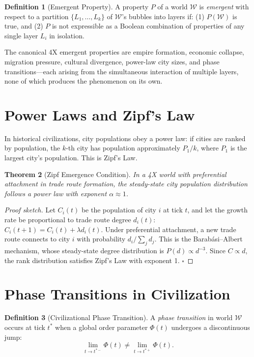 \documentclass[11pt,a4paper,openany]{book}
\theoremstyle{plain}
\newtheorem{theorem}{Theorem}[chapter]
\theoremstyle{definition}
\newtheorem{definition}[theorem]{Definition}
\theoremstyle{remark}
\newcommand{\world}{\ensuremath{\mathcal{W}}}
\begin{document}
\begin{definition}[Emergent Property]
  A property $P$ of a world $\world$ is \emph{emergent} with respect to
  a partition $\{L_1, \ldots, L_k\}$ of $\world$'s bubbles into layers if:
  (1) $P(\world)$ is true, and
  (2) $P$ is not expressible as a Boolean combination of properties
  of any single layer $L_i$ in isolation.
\end{definition}

The canonical 4X emergent properties are empire formation, economic
collapse, migration pressure, cultural divergence, power-law city sizes,
and phase transitions---each arising from the simultaneous interaction
of multiple layers, none of which produces the phenomenon on its own.

\section{Power Laws and Zipf's Law}

In historical civilizations, city populations obey a power law: if cities
are ranked by population, the $k$-th city has population approximately
$P_1 / k$, where $P_1$ is the largest city's population. This is Zipf's Law.

\begin{theorem}[Zipf Emergence Condition]
  In a 4X world with preferential attachment in trade route formation,
  the steady-state city population distribution follows a power law
  with exponent $\alpha \approx 1$.
\end{theorem}
\begin{proof}[Proof sketch]
  Let $C_i(t)$ be the population of city $i$ at tick $t$, and let the
  growth rate be proportional to trade route degree $d_i(t)$:
  $C_i(t+1) = C_i(t) + \lambda d_i(t)$.
  Under preferential attachment, a new trade route connects to city $i$
  with probability $d_i / \sum_j d_j$. This is the Barab\'{a}si--Albert
  mechanism, whose steady-state degree distribution is
  $P(d) \propto d^{-3}$. Since $C \propto d$, the rank distribution
  satisfies Zipf's Law with exponent 1. $\square$
\end{proof}

\section{Phase Transitions in Civilization}

\begin{definition}[Civilizational Phase Transition]
  A \emph{phase transition} in world $\world$ occurs at tick $t^*$ when
  a global order parameter $\Phi(t)$ undergoes a discontinuous jump:
  \[
    \lim_{t \to t^{*-}} \Phi(t) \neq \lim_{t \to t^{*+}} \Phi(t).
  \]
\end{definition}
\end{document}
